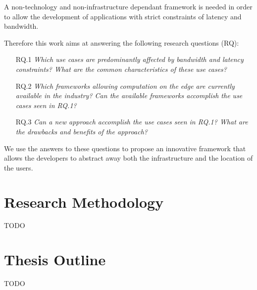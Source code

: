 A non-technology and non-infrastructure dependant framework is needed in order to allow the development of applications with strict constraints of latency and bandwidth.

Therefore this work aims at answering the following research questions (RQ):
\begin{itemize}
    \item[RQ.1]\emph{Which use cases are predominantly affected by bandwidth and latency constraints? What are the common characteristics of these use cases?}
    
    \item[RQ.2]\emph{Which frameworks allowing computation on the edge are currently available in the industry? Can the available frameworks accomplish the use cases seen in RQ.1?}
    
    \item[RQ.3]\emph{Can a new approach accomplish the use cases seen in RQ.1? What are the drawbacks and benefits of the approach?}
\end{itemize}

We use the answers to these questions to propose an innovative framework that allows the developers to abstract away both the infrastructure and the location of the users.

\section{Research Methodology}
TODO

\section{Thesis Outline}
TODO



\iffalse
Here you explain the structure of the thesis.

\begin{example}
The thesis is structured in the following way:
\begin{itemize}
\item In \autoref{ch:preliminaries_and_sota}, we present ... .
\item In \autoref{ch:problem_formulation}, we formulate the problem we address in the thesis and ... .
\item In \autoref{ch:design}, we present our solution for ... .
\item In \autoref{ch:experiments}, we show experimental results of our proposed methods in different settings ... .
\item Finally, in \autoref{ch:conclusions}, we present our conclusions and possible future paths toward which our work could be extended.
\end{itemize}
\end{example}
\fi